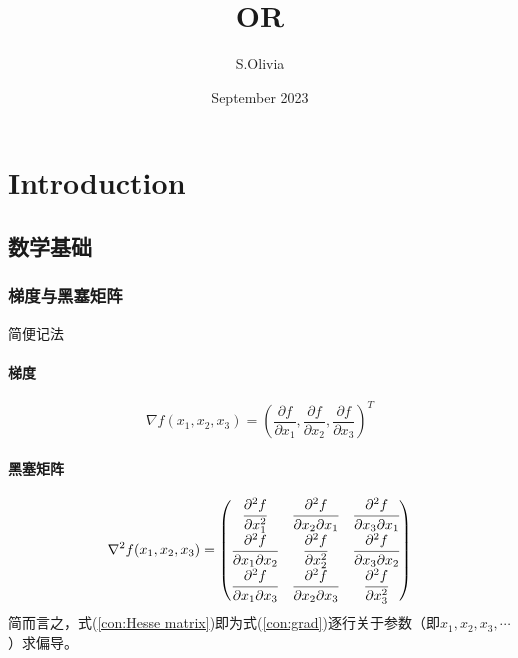 \documentclass{book}
\title{OR}
\author{S.Olivia}
\date{September 2023}
\begin{document}
\maketitle

\tableofcontents

\chapter{Introduction}
\section{数学基础}
\subsection{梯度与黑塞矩阵}
简便记法

\subsubsection{梯度}

\begin{equation}
    \nabla f(x_1, x_2, x_3) = (\frac{\partial f}{\partial x_1}, \frac{\partial f}{\partial x_2}, \frac{\partial f}{\partial x_3})^T
    \label{con:grad}
\end{equation}

\subsubsection{黑塞矩阵}

\begin{equation}
    \nabla^2 f(x_1, x_2, x_3)=
    \begin{pmatrix}
        \cfrac{\partial^2 f}{\partial x_1^2}           & \cfrac{\partial^2 f}{\partial x_2\partial x_1}  & \cfrac{\partial^2 f}{\partial x_3\partial x_1} \\
        \cfrac{\partial^2 f}{\partial x_1\partial x_2} & \cfrac{\partial^2 f}{\partial x_2^2}            & \cfrac{\partial^2 f}{\partial x_3\partial x_2} \\
        \cfrac{\partial^2 f}{\partial x_1\partial x_3} & \cfrac{\partial^2 f}{\partial x_2 \partial x_3} & \cfrac{\partial^2 f}
        {\partial x_3^2}
        \label{con:Hesse matrix}
    \end{pmatrix}
\end{equation}
简而言之，式(\ref{con:Hesse matrix})即为式(\ref{con:grad})逐行关于参数（即$x_1, x_2, x_3, \cdots$）求偏导。
\end{document}
